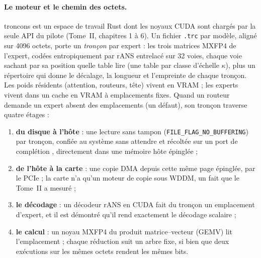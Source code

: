 \documentclass[11pt, a4paper]{article}
\theoremstyle{remark}
\begin{document}
\paragraph{Le moteur et le chemin des octets.} troncons est un espace de travail Rust dont les noyaux CUDA sont chargés par la seule API du pilote (Tome~II, chapitres 1 à 6). Un fichier \texttt{.trc} par modèle, aligné sur \num{4096} octets, porte un \emph{tronçon} par expert : les trois matrices MXFP4 de l'expert, codées entropiquement par rANS entrelacé sur 32 voies, chaque voie sachant par sa position quelle table lire (une table par classe d'échelle $\kappa$), plus un répertoire qui donne le décalage, la longueur et l'empreinte de chaque tronçon. Les poids résidents (attention, routeurs, tête) vivent en VRAM ; les experts vivent dans un cache en VRAM à emplacements fixes. Quand un routeur demande un expert absent des emplacements (un défaut), son tronçon traverse quatre étages :
\begin{enumerate}
\item \textbf{du disque à l'hôte} : une lecture sans tampon (\texttt{FILE\_FLAG\_NO\_BUFFERING}) par tronçon, confiée au système sans attendre et récoltée sur un port de complétion \citep{microsoft2025iocp}, directement dans une mémoire hôte épinglée ;
\item \textbf{de l'hôte à la carte} : une copie DMA depuis cette même page épinglée, par le PCIe ; la carte n'a qu'un moteur de copie sous WDDM, un fait que le Tome~II a mesuré ;
\item \textbf{le décodage} : un décodeur rANS en CUDA fait du tronçon un emplacement d'expert, et il est démontré qu'il rend exactement le décodage scalaire ;
\item \textbf{le calcul} : un noyau MXFP4 du produit matrice--vecteur (GEMV) lit l'emplacement ; chaque réduction suit un arbre fixe, si bien que deux exécutions sur les mêmes octets rendent les mêmes bits.
\end{enumerate}
\end{document}
